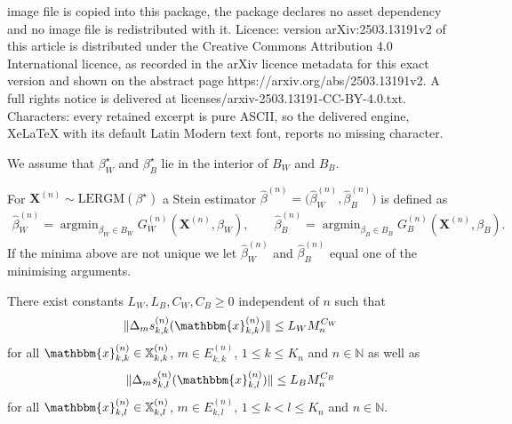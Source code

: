 \documentclass[10pt,a4paper]{amsart}
\DeclareMathOperator*{\argmin}{argmin}
\begin{document}
image file is copied into this package, the package declares no asset dependency and no image file is redistributed with it. Licence: version arXiv:2503.13191v2 of this article is distributed under the Creative Commons Attribution 4.0 International licence, as recorded in the arXiv licence metadata for this exact version and shown on the abstract page https://arxiv.org/abs/2503.13191v2. A full rights notice is delivered at licenses/arxiv-2503.13191-CC-BY-4.0.txt. Characters: every retained excerpt is pure ASCII, so the delivered engine, XeLaTeX with its default Latin Modern text font, reports no missing character.
\begin{Assumption} \label{ass_compact_par}
    We assume that $\beta_W^{\star}$ and $\beta_B^{\star}$ lie in the interior of $B_W$ and $B_B$. 
\end{Assumption}

\begin{Definition} \label{definition_stein_est_conv_analysis}
    For $\mathbf{X}^{(n)}\sim \mathrm{LERGM}(\beta^{\star})$ a Stein estimator $\hat{\beta}^{(n)}= \big( \hat{\beta}_W^{(n)}, \hat{\beta}_B^{(n)} \big) $ is defined as
\begin{align*}
    \hat{\beta}_W^{(n)} = \argmin_{\beta_W \in B_W} G_W^{(n)}(\mathbf{X}^{(n)},\beta_W),  \qquad \hat{\beta}_B^{(n)} =  \argmin_{\beta_B \in B_B} G_B^{(n)}(\mathbf{X}^{(n)},\beta_B).
\end{align*}
If the minima above are not unique we let $\hat{\beta}_W^{(n)}$ and $\hat{\beta}_B^{(n)}$ equal one of the minimising arguments.
\end{Definition}

\begin{Assumption}  \label{ass_growth_statis}
There exist constants $L_W,L_B,C_W,C_B \geq 0$ independent of $n$ such that
\begin{align*}
    \Vert \Delta_m s_{k,k}^{(n)}(\mathbbm{x}_{k,k}^{(n)}) \Vert \leq L_W   M_n^{C_W} 
\end{align*}
for all $\mathbbm{x}_{k,k}^{(n)} \in \mathbb{X}_{k,k}^{(n)}$, $m \in E_{k,k}^{(n)}$, $1 \leq k \leq K_n$ and $n \in \mathbb{N}$ as well as
\begin{align*}  
    \Vert \Delta_m s_{k,l}^{(n)}(\mathbbm{x}_{k,l}^{(n)}) \Vert \leq L_B  M_n^{C_B} 
\end{align*}
for all $\mathbbm{x}_{k,l}^{(n)} \in \mathbb{X}_{k,l}^{(n)}$, $m \in E_{k,l}^{(n)}$, $1 \leq k <l \leq K_n$ and $n \in \mathbb{N}$.
\end{Assumption}
\end{document}
